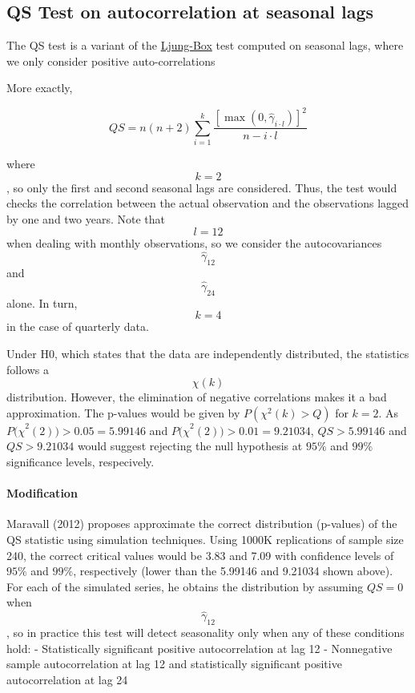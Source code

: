 \documentclass[
]{book}
\begin{document}
\hypertarget{qs-test-on-autocorrelation-at-seasonal-lags}{%
\subsection{QS Test on autocorrelation at seasonal lags}\label{qs-test-on-autocorrelation-at-seasonal-lags}}

The QS test is a variant of the \href{../theory/Tests_LB.html}{Ljung-Box} test computed on seasonal lags, where we only consider positive auto-correlations

More exactly,

\[ QS=n \left(n+2\right)\sum_{i=1}^k\frac{\left[ \max  \left(0, \hat\gamma_{i \cdot l}\right)\right]^2}{n-i \cdot l}\]

where \[k=2\], so only the first and second seasonal lags are considered. Thus, the test would checks the correlation between the
actual observation and the observations lagged by one and two years. Note that \[l=12\] when dealing with monthly observations,
so we consider the autocovariances \[\hat\gamma_{12}\] and \[\hat\gamma_{24}\] alone. In turn, \[k=4\] in the case of quarterly data.

Under H0, which states that the data are independently distributed, the statistics follows a \[\chi \left(k\right)\] distribution. However,
the elimination of negative correlations makes it a bad approximation. The p-values would be given
by \(P(\chi^{2}\left( k \right) > Q)\) for \(k = 2\). As \({P(\chi}^{2}(2)) > 0.05 = 5.99146\) and
\({P(\chi}^{2}(2)) > 0.01 = 9.21034\), \(QS > 5.99146\) and \(QS > 9.21034\)
would suggest rejecting the null hypothesis at \(95\%\) and \(99\%\)
significance levels, respecively.

\hypertarget{modification}{%
\paragraph{Modification}\label{modification}}

Maravall (2012) proposes approximate the correct distribution (p-values) of the QS statistic using simulation techniques. Using 1000K replications of sample size 240,
the correct critical values would be 3.83 and 7.09 with confidence levels of \(95\%\) and \(99\%\), respectively (lower than the 5.99146 and 9.21034 shown above). For
each of the simulated series,
he obtains the distribution by assuming \(QS=0\) when \[\hat\gamma_{12}\], so in practice this test will detect seasonality only when
any of these conditions hold:
- Statistically significant positive autocorrelation at lag 12
- Nonnegative sample autocorrelation at lag 12 and statistically significant positive autocorrelation at lag 24
\end{document}
